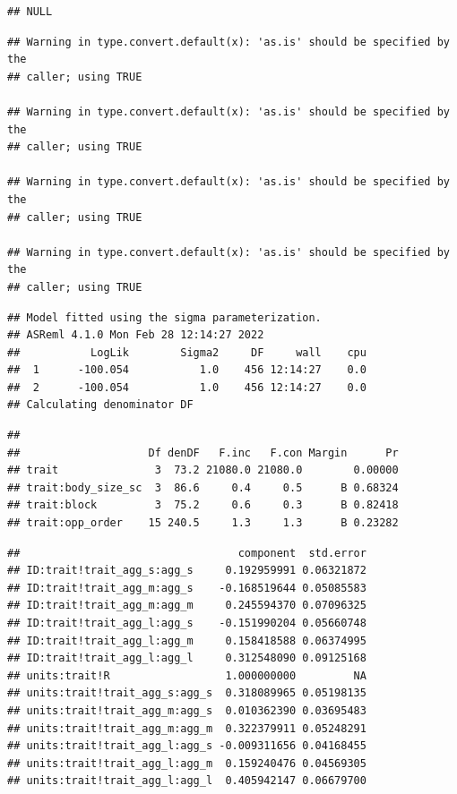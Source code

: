 \documentclass[
  12pt,
]{book}
\newenvironment{Shaded}{\begin{snugshade}}{\end{snugshade}}
\newcommand{\KeywordTok}[1]{\textcolor[rgb]{0.13,0.29,0.53}{\textbf{#1}}}
\newcommand{\NormalTok}[1]{#1}
\newcommand{\OperatorTok}[1]{\textcolor[rgb]{0.81,0.36,0.00}{\textbf{#1}}}
\newcommand{\StringTok}[1]{\textcolor[rgb]{0.31,0.60,0.02}{#1}}
\begin{document}
\begin{verbatim}
## NULL
\end{verbatim}

\begin{verbatim}
## Warning in type.convert.default(x): 'as.is' should be specified by the
## caller; using TRUE

## Warning in type.convert.default(x): 'as.is' should be specified by the
## caller; using TRUE

## Warning in type.convert.default(x): 'as.is' should be specified by the
## caller; using TRUE

## Warning in type.convert.default(x): 'as.is' should be specified by the
## caller; using TRUE
\end{verbatim}

\begin{verbatim}
## Model fitted using the sigma parameterization.
## ASReml 4.1.0 Mon Feb 28 12:14:27 2022
##           LogLik        Sigma2     DF     wall    cpu
##  1      -100.054           1.0    456 12:14:27    0.0
##  2      -100.054           1.0    456 12:14:27    0.0
## Calculating denominator DF
\end{verbatim}

\begin{verbatim}
## 
##                    Df denDF   F.inc   F.con Margin      Pr
## trait               3  73.2 21080.0 21080.0        0.00000
## trait:body_size_sc  3  86.6     0.4     0.5      B 0.68324
## trait:block         3  75.2     0.6     0.3      B 0.82418
## trait:opp_order    15 240.5     1.3     1.3      B 0.23282
\end{verbatim}

\begin{Shaded}
\end{Shaded}

\begin{verbatim}
##                                  component  std.error
## ID:trait!trait_agg_s:agg_s     0.192959991 0.06321872
## ID:trait!trait_agg_m:agg_s    -0.168519644 0.05085583
## ID:trait!trait_agg_m:agg_m     0.245594370 0.07096325
## ID:trait!trait_agg_l:agg_s    -0.151990204 0.05660748
## ID:trait!trait_agg_l:agg_m     0.158418588 0.06374995
## ID:trait!trait_agg_l:agg_l     0.312548090 0.09125168
## units:trait!R                  1.000000000         NA
## units:trait!trait_agg_s:agg_s  0.318089965 0.05198135
## units:trait!trait_agg_m:agg_s  0.010362390 0.03695483
## units:trait!trait_agg_m:agg_m  0.322379911 0.05248291
## units:trait!trait_agg_l:agg_s -0.009311656 0.04168455
## units:trait!trait_agg_l:agg_m  0.159240476 0.04569305
## units:trait!trait_agg_l:agg_l  0.405942147 0.06679700
\end{verbatim}
\end{document}
